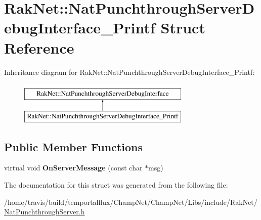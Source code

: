 \hypertarget{struct_rak_net_1_1_nat_punchthrough_server_debug_interface___printf}{\section{Rak\-Net\-:\-:Nat\-Punchthrough\-Server\-Debug\-Interface\-\_\-\-Printf Struct Reference}
\label{struct_rak_net_1_1_nat_punchthrough_server_debug_interface___printf}
}
Inheritance diagram for Rak\-Net\-:\-:Nat\-Punchthrough\-Server\-Debug\-Interface\-\_\-\-Printf\-:\begin{figure}[H]
\begin{center}
\leavevmode
\includegraphics[height=2.000000cm]{struct_rak_net_1_1_nat_punchthrough_server_debug_interface___printf}
\end{center}
\end{figure}
\subsection*{Public Member Functions}
\begin{DoxyCompactItemize}
\item 
\hypertarget{struct_rak_net_1_1_nat_punchthrough_server_debug_interface___printf_a8ae775e0a93756e667b6199deb52ae3c}{virtual void {\bfseries On\-Server\-Message} (const char $\ast$msg)}\label{struct_rak_net_1_1_nat_punchthrough_server_debug_interface___printf_a8ae775e0a93756e667b6199deb52ae3c}

\end{DoxyCompactItemize}


The documentation for this struct was generated from the following file\-:\begin{DoxyCompactItemize}
\item 
/home/travis/build/temportalflux/\-Champ\-Net/\-Champ\-Net/\-Libs/include/\-Rak\-Net/\hyperlink{_nat_punchthrough_server_8h}{Nat\-Punchthrough\-Server.\-h}\end{DoxyCompactItemize}
